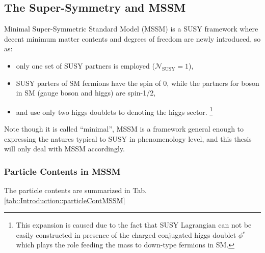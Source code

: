 \subsection{The Super-Symmetry and MSSM}
Minimal Super-Symmetric Standard Model (MSSM) is a SUSY framework where decent minimum matter contents and degrees of freedom are newly introduced, so as:
\begin{itemize}
\item only one set of SUSY partners is employed ($\mathcal{N}_{\mathrm{SUSY}}=1$),
\item SUSY parters of SM fermions have the spin of 0, while the partners for boson in SM (gauge boson and higgs) are spin-1/2,
\item and use only two higgs doublets to denoting the higgs sector.
\footnote{This expansion is caused due to the fact that  SUSY Lagrangian can not be easily constructed in presence of the charged conjugated higgs doublet $\phi^c$ which plays the role feeding the mass to down-type fermions in SM.}
\end{itemize}

Note though it is called ``minimal'', MSSM is a framework general enough to expressing the natures typical to SUSY in phenomenology level, and this thesis will only deal with MSSM accordingly.


\subsubsection{Particle Contents in MSSM}
The particle contents are summarized in Tab. \ref{tab::Introduction::particleContMSSM}

